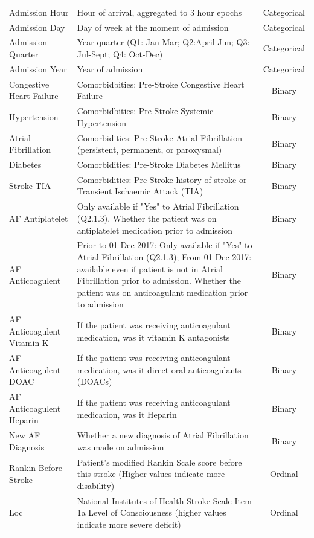 \documentclass[12pt,a4paper, pdftex]{elsarticle}
\begin{document}
\begin{longtable}{|l|p{8.5cm}|c|}
        Admission Hour & Hour of arrival, aggregated to 3 hour epochs & Categorical \\
        Admission Day & Day of week at the moment of admission & Categorical \\
        Admission Quarter & Year quarter (Q1: Jan-Mar; Q2:April-Jun; Q3: Jul-Sept; Q4: Oct-Dec) & Categorical \\
        Admission Year & Year of admission & Categorical \\
        Congestive Heart Failure &Comorbidbities: Pre-Stroke Congestive Heart Failure  & Binary \\
        Hypertension & Comorbidbities: Pre-Stroke Systemic Hypertension & Binary \\
        Atrial Fibrillation & Comorbidities: Pre-Stroke Atrial Fibrillation (persistent, permanent, or paroxysmal) & Binary \\
        Diabetes & Comorbidities: Pre-Stroke Diabetes Mellitus & Binary \\
        Stroke TIA & Comorbidities: Pre-Stroke history of stroke or Transient Ischaemic Attack (TIA) & Binary \\
        AF Antiplatelet & Only available if "Yes" to Atrial Fibrillation (Q2.1.3). Whether the patient was on antiplatelet medication prior to admission                              & Binary \\
        AF Anticoagulent & Prior to 01-Dec-2017: Only available if "Yes" to Atrial Fibrillation (Q2.1.3); From 01-Dec-2017: available even if patient is not in Atrial Fibrillation prior to admission. Whether the patient was on anticoagulant medication prior to admission & Binary \\
        AF Anticoagulent Vitamin K & If the patient was receiving anticoagulant medication, was it vitamin K antagonists & Binary \\
        AF Anticoagulent DOAC & If the patient was receiving anticoagulant medication, was it direct oral anticoagulants (DOACs) & Binary \\
        AF Anticoagulent Heparin & If the patient was receiving anticoagulant medication, was it Heparin & Binary \\
        New AF Diagnosis & Whether a new diagnosis of Atrial Fibrillation was made on admission & Binary \\
        Rankin Before Stroke & Patient's modified Rankin Scale score before this stroke (Higher values indicate more disability) & Ordinal \\
        Loc & National Institutes of Health Stroke Scale Item 1a Level of Consciousness (higher values indicate more severe deficit) & Ordinal \\

\end{longtable}
\end{document}
